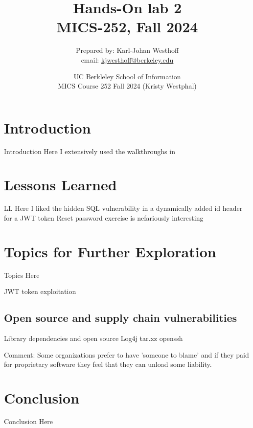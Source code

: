 \documentclass[
	letterpaper, %
	10pt, %
	unnumberedsections, %
	twoside, %
]{APAAssignment}
\title{Hands-On lab 2 \\ MICS-252, Fall 2024} %
\date{UC Berkleley School of Information \\
MICS Course 252 Fall 2024 (Kristy Westphal)
}
\author{
	Prepared by: Karl-Johan Westhoff \\
	email: \href{mailto:kjwesthoff@berkeley.edu}{kjwesthoff@berkeley.edu}
}
\begin{document}
\onecolumn
\maketitle %


\section{Introduction}
Introduction Here
I extensively used the walkthroughs in \cite{CycubicsDocsWebGoat}

\section{Lessons Learned}
LL Here
I liked the hidden SQL vulnerability in a dynamically added id header for a JWT token
Reset password exercise is nefariously interesting


\section{Topics for Further Exploration}
Topics Here

JWT token exploitation


\subsection{Open source and supply chain vulnerabilities}
Library dependencies and open source
Log4j
tar.xz
openssh

Comment:
Some organizations prefer to have 'someone to blame' and if they paid for proprietary software they feel that they can unload some liability.


\section{Conclusion}
Conclusion Here

\clearpage
\printbibliography %

\end{document}
